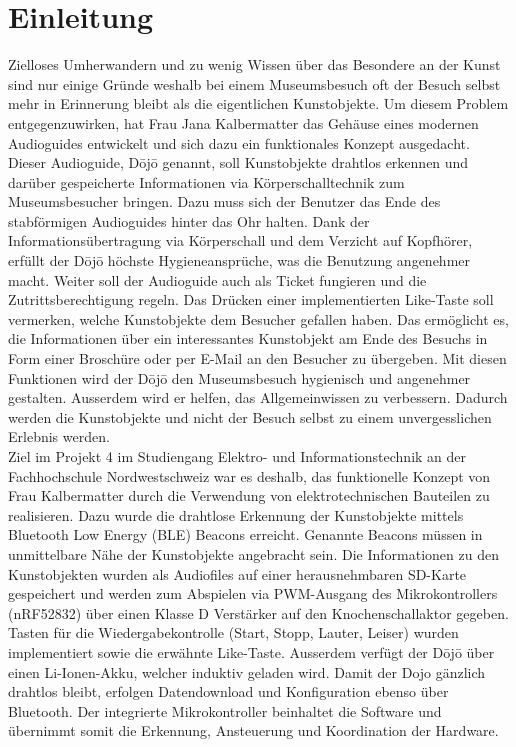 \section{Einleitung}\label{sec:einleitung}
Zielloses Umherwandern und zu wenig Wissen über das Besondere an der Kunst sind nur einige Gründe weshalb bei einem Museumsbesuch oft der Besuch selbst mehr in Erinnerung bleibt als die eigentlichen Kunstobjekte. Um diesem Problem entgegenzuwirken, hat Frau Jana Kalbermatter das Gehäuse eines modernen Audioguides entwickelt und sich dazu ein funktionales Konzept ausgedacht. Dieser Audioguide, Dōjō genannt, soll Kunstobjekte drahtlos erkennen und darüber gespeicherte Informationen via Körperschalltechnik zum Museumsbesucher bringen. Dazu muss sich der Benutzer das Ende des stabförmigen Audioguides hinter das Ohr halten. Dank der Informationsübertragung via Körperschall und dem Verzicht auf Kopfhörer, erfüllt der Dōjō höchste Hygieneansprüche, was die Benutzung angenehmer macht. Weiter soll der Audioguide auch als Ticket fungieren und die Zutrittsberechtigung regeln. Das Drücken einer implementierten \glqq Like\grqq-Taste soll vermerken, welche Kunstobjekte dem Besucher gefallen haben. Das ermöglicht es, die Informationen über ein interessantes Kunstobjekt am Ende des Besuchs in Form einer Broschüre oder per E-Mail an den Besucher zu übergeben. Mit diesen Funktionen wird der Dōjō den Museumsbesuch hygienisch und angenehmer gestalten. Ausserdem wird er helfen, das Allgemeinwissen zu verbessern. Dadurch werden die Kunstobjekte und nicht der Besuch selbst zu einem unvergesslichen Erlebnis werden.\\
Ziel im Projekt 4 im Studiengang Elektro- und Informationstechnik an der Fachhochschule Nordwestschweiz war es deshalb, das funktionelle Konzept von Frau Kalbermatter durch die Verwendung von elektrotechnischen Bauteilen zu realisieren. Dazu wurde die drahtlose Erkennung der Kunstobjekte mittels Bluetooth Low Energy (BLE) Beacons erreicht. Genannte Beacons müssen in unmittelbare Nähe der Kunstobjekte angebracht sein. Die Informationen zu den Kunstobjekten wurden als Audiofiles auf einer herausnehmbaren SD-Karte gespeichert und werden zum Abspielen via PWM-Ausgang des Mikrokontrollers (nRF52832) über einen Klasse D Verstärker auf den Knochenschallaktor gegeben. Tasten für die Wiedergabekontrolle (Start, Stopp, Lauter, Leiser) wurden implementiert sowie die erwähnte \glqq Like\grqq -Taste. Ausserdem verfügt der Dōjō über einen Li-Ionen-Akku, welcher induktiv geladen wird. Damit der Dojo gänzlich drahtlos bleibt, erfolgen Datendownload und Konfiguration ebenso über Bluetooth. Der integrierte Mikrokontroller beinhaltet die Software und übernimmt somit die Erkennung, Ansteuerung und Koordination der Hardware.\\
